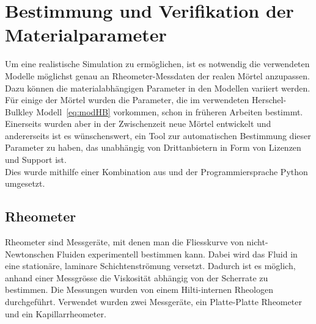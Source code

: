 \section{Bestimmung und Verifikation der Materialparameter}
\label{Kapitel:Parameter}
Um eine realistische Simulation zu ermöglichen, ist es notwendig die verwendeten Mo\-delle möglichst genau an Rheometer-Messdaten der realen Mörtel anzupassen. Dazu können die materialabhängigen Parameter in den Modellen variiert werden.\\
Für einige der Mörtel wurden die Parameter, die im verwendeten Herschel-Bulkley Modell~\eqref{eq:modHB} vorkommen, schon in früheren Arbeiten bestimmt. \\
Einerseits wurden aber in der Zwischenzeit neue Mörtel entwickelt und andererseits ist es wünschenswert, ein Tool zur automatischen Bestimmung dieser Parameter zu haben, das unabhängig von Drittanbietern in Form von Lizenzen und Support ist. \\
Dies wurde mithilfe einer Kombination aus \openfoam{} und der Programmiersprache Python umgesetzt.
%
\subsection{Rheometer}
Rheometer sind Messgeräte, mit denen man die Fliesskurve von nicht-Newtonschen Fluiden experimentell bestimmen kann.
Dabei wird das Fluid in eine stationäre, laminare Schichtenströmung versetzt. Dadurch ist es möglich, anhand einer
Messgrösse die Viskosität abhängig von der Scherrate zu bestimmen.
Die Messungen wurden von einem Hilti-internen Rheo\-logen durchgeführt. Verwendet wurden zwei Messgeräte, ein Platte-Platte Rheometer und ein Kapillarrheometer.
%
